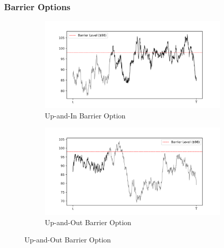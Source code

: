 \documentclass[a4paper]{report}
\begin{document}
\subsubsection{Barrier Options}
\begin{figure}[H]
    \begin{subfigure}{.5\linewidth}
      \includegraphics[width=\linewidth]{images/up_in_option.png}
      \caption{Up-and-In Barrier Option}
      \label{fig:up_in_option}
    \end{subfigure}\hfill
    \begin{subfigure}{.5\linewidth}
      \includegraphics[width=\linewidth]{images/up_out_option.png}
      \caption{Up-and-Out Barrier Option}
      \label{fig:up_out_option}
    \end{subfigure}
    

\end{figure}
\end{document}
